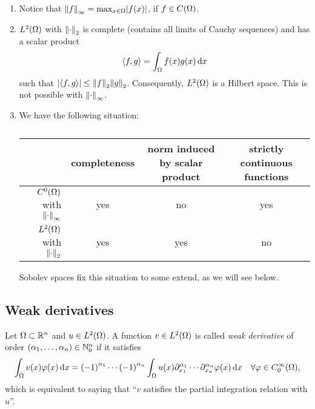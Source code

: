 \begin{remark}
	\begin{enumerate}
		\item Notice that \(\norm*{f}_\infty = \max_{x \in \Omega}\absolute*{f\parentheses*{x}}\), if \(f \in C\parentheses*{\Omega}\).
		\item \(L^2\parentheses*{\Omega}\) with \(\norm*{\cdot}_2\) is complete (contains all limits of Cauchy sequences) and has a scalar product
		\[
			\angles*{f, g} = \int_\Omega f\parentheses*{x}g\parentheses*{x}\d x
		\]
		such that \(\absolute*{\angles*{f, g}} \le \norm*{f}_2 \norm*{g}_2\).
		Consequently, \(L^2\parentheses*{\Omega}\) is a Hilbert space.
		This is not possible with \(\norm*{\cdot}_\infty\).
		\item We have the following situation:

		\begin{table}[h]
			\centering
			\begin{tabular}{r|ccc}
				\toprule
				& completeness & norm induced by scalar product & strictly continuous functions\\
				\midrule
				\(C^0\parentheses*{\Omega}\) with \(\norm*{\cdot}_\infty\) & yes & no & yes\\
				\(L^2\parentheses*{\Omega}\) with \(\norm*{\cdot}_2\) & yes & yes & no\\
				\bottomrule
			\end{tabular}
			\caption{}
			\label{tab:2-1}
		\end{table}

		Sobolev spaces fix this situation to some extend, as we will see below.
	\end{enumerate}
\end{remark}


\subsection{Weak derivatives}

\begin{definition}
	Let \(\Omega \subset \R^n\) and \(u \in L^2\parentheses*{\Omega}\).
	A function \(v \in L^2\parentheses*{\Omega}\) is called \emph{weak derivative} of order \(\parentheses*{\alpha_1, \ldots, \alpha_n} \in \N_0^n\) if it satisfies
	\[
		\int_\Omega v\parentheses*{x}\varphi\parentheses*{x}\d x = \parentheses*{-1}^{\alpha_1}\cdots\parentheses*{-1}^{\alpha_n}\int_\Omega u\parentheses*{x}\partial_{x_1}^{\alpha_1}\cdots\partial_{x_n}^{\alpha_n}\varphi\parentheses*{x}\d x \quad \forall\varphi \in C_0^\infty\parentheses*{\Omega},
	\]
	which is equivalent to saying that ``\(v\) satisfies the partial integration relation with \(u\)''.
\end{definition}

